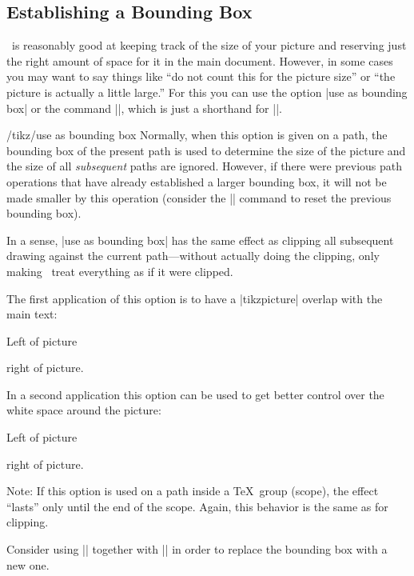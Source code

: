 \subsection{Establishing a Bounding Box}

\pgfname\ is reasonably good at keeping track of the size of your picture
and reserving just the right amount of space for it in the main
document. However, in some cases you may want to say things like
``do not count this for the picture size'' or ``the picture is
actually a little large.'' For this you can use the option
|use as bounding box| or the command |\useasboundingbox|, which is just
a shorthand for ||.

\begin{key}{/tikz/use as bounding box}
  Normally, when this option is given on a path, the bounding box of
  the present path is used to determine the size of the picture and
  the size of all \emph{subsequent} paths are
  ignored. However, if there were previous path operations that have
  already established a larger bounding box, it will not be made
  smaller by this operation (consider the |\pgfresetboundingbox| command
  to reset the previous bounding box).

  In a sense, |use as bounding box| has the same effect as clipping
  all subsequent drawing against the current path---without actually
  doing the clipping, only making \pgfname\ treat everything as if it
  were clipped.

  The first application of this option is to have a |{tikzpicture}|
  overlap with the main text:

\begin{codeexample}[]
Left of pictureright of picture.
\end{codeexample}

  In a second application this option can be used to get better
  control over the white space around the picture:

\begin{codeexample}[]
Left of picture
right of picture.
\end{codeexample}

  Note: If this option is used on a path inside a \TeX\ group (scope),
  the effect ``lasts'' only until the end of the scope. Again, this
  behavior is the same as for clipping.


  Consider using |\useasboundingbox| together with |\pgfresetboundingbox| in order to replace the bounding box with a new one.
\end{key}

